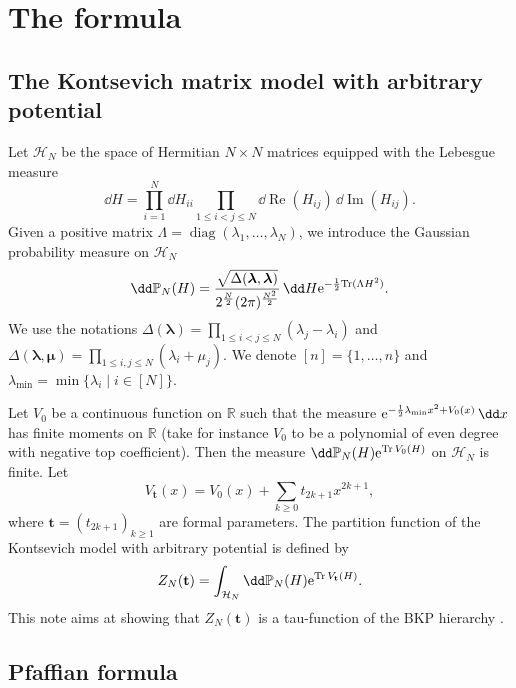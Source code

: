 \section{The formula}\label{Chap1}

\subsection{The Kontsevich matrix model with arbitrary potential}

Let $\mathcal{H}_N$ be the space of Hermitian $N \times N$ matrices
equipped with the Lebesgue measure
\[
\dd H= \prod_{i=1}^N \dd H_{ii}
 \prod_{1 \leq i < j \leq N} \dd\operatorname{Re}(H_{ij})\, \dd\operatorname{Im}(H_{ij}).
\]
Given a positive matrix $\Lambda = \operatorname{diag}(\lambda_1,\dots,\lambda_N)$,
we introduce the Gaussian probability measure on $\mathcal{H}_N$
\begin{equation}
\label{theGauss}
\dd \mathbb{P}_N(H) = \frac{\sqrt{\Delta(\boldsymbol{\lambda},\boldsymbol{\lambda})}}{2^{\frac{N}{2}} (2\pi)^{\frac{N^2}{2}}}\,\dd H {\rm e}^{-\frac{1}{2}{\rm Tr}(\Lambda H^2)}.
\end{equation}
We use the notations $\Delta(\boldsymbol{\lambda}) = \prod_{1 \leq i < j \leq N} (\lambda_j - \lambda_i)$ and $\Delta(\boldsymbol{\lambda},\boldsymbol{\mu}) = \prod_{1 \leq i,j \leq N} (\lambda_i + \mu_j)$. We denote $[n] = \{1,\dots,n\}$ and $\lambda_{\min} = \min\{\lambda_i\mid i \in [N]\}$.

Let $V_0$ be a continuous function on $\mathbb{R}$ such that the measure ${\rm e}^{- \frac{1}{2}\lambda_{\min} x^2 + V_0(x)}\,\dd x$ has finite moments on $\mathbb{R}$ (take for instance $V_0$ to be a polynomial of even degree with negative top coefficient). Then the measure $\dd \mathbb{P}_N(H) {\rm e}^{ \operatorname{Tr}V_0(H)}$ on $\mathcal{H}_N$ is finite. Let
\[
V_{\mathbf{t}}(x) = V_0(x) + \sum_{k \geq 0} t_{2k + 1} x^{2k + 1},
\]
where $\mathbf{t} = (t_{2k + 1})_{k \geq 1}$ are formal parameters. The partition function of the Kontsevich model with arbitrary potential is defined by
\begin{equation}
\label{Zdef} Z_N(\mathbf{t}) = \int_{\mathcal{H}_N} \dd\mathbb{P}_N(H) {\rm e}^{\operatorname{Tr}V_{\mathbf{t}}(H)}.
\end{equation}
This note aims at showing that $Z_N(\mathbf{t})$ is a
tau-function of the BKP hierarchy \cite{Date:1981qz}.

\subsection{Pfaffian formula}

